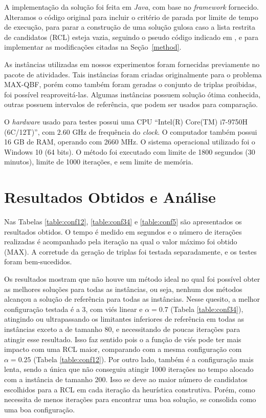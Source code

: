 \documentclass{MO824}
\begin{document}
    A implementação da solução foi feita em \emph{Java}, com base no \textit{framework} fornecido. Alteramos o código original para incluir o critério de parada por limite de tempo de execução, para parar a construção de uma solução gulosa caso a lista restrita de candidatos (RCL) esteja vazia, seguindo o pseudo código indicado em \cite{grasp}, e para implementar as modificações citadas na Seção~\ref{method}.

    As instâncias utilizadas em nossos experimentos foram fornecidas previamente no pacote de atividades. Tais instâncias foram criadas originalmente para o problema MAX-QBF, porém como também foram geradas o conjunto de triplas proibidas, foi possível reaproveitá-las. Algumas instâncias possuem solução ótima conhecida, outras possuem intervalos de referência, que podem ser usados para comparação.
        
    O \textit{hardware} usado para testes possui uma CPU ``Intel(R) Core(TM) i7-9750H (6C/12T)'', com $2.60$ GHz de frequência do \textit{clock}. O computador também possui 16 GB de RAM, operando com 2660 MHz. O sistema operacional utilizado foi o Windows 10 (64 bits). O método foi executado com limite de 1800 segundos (30 minutos), limite de 1000 iterações, e sem limite de memória.

\vspace{-0.18cm}
\section{Resultados Obtidos e Análise}
Nas Tabelas \ref{table:conf12}, \ref{table:conf34} e \ref{table:conf5} são apresentados os resultados obtidos. O tempo é medido em segundos e o número de iterações realizadas é acompanhado pela iteração na qual o valor máximo foi obtido (MAX). A corretude da geração de triplas foi testada separadamente, e os testes foram bem-sucedidos.

Os resultados mostram que não houve um método ideal no qual foi possível obter as melhores soluções para todas as instâncias, ou seja, nenhum dos métodos alcançou a solução de referência para todas as instâncias. Nesse quesito, a melhor configuração testada é a 3, com viés linear e $\alpha = 0.7$ (Tabela \ref{table:conf34}), atingindo ou ultrapassando os limitantes inferiores de referência em todas as instâncias exceto a de tamanho 80, e necessitando de poucas iterações para atingir esse resultado.
Isso faz sentido pois o a função de viés pode ter mais impacto com uma RCL maior, comparando com a mesma configuração com $\alpha = 0.25$ (Tabela \ref{table:conf12}). Por outro lado, também é a configuração mais lenta, sendo a única que não conseguiu atingir 1000 iterações no tempo alocado com a instância de tamanho 200. Isso se deve ao maior número de candidatos escolhidos para a RCL em cada iteração da heurística construtiva. Porém, como necessita de menos iterações para encontrar uma boa solução, se consolida como uma boa configuração.
\end{document}
